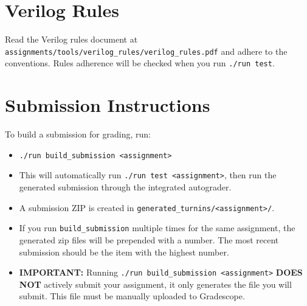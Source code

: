 \documentclass[12pt]{article}
\begin{document}
\section*{Verilog Rules}
Read the Verilog rules document at \texttt{assignments/tools/verilog\_rules/verilog\_rules.pdf} and adhere to the conventions.
Rules adherence will be checked when you run \texttt{./run test}.

\section*{Submission Instructions}

To build a submission for grading, run:
\begin{itemize}
\item \texttt{./run build\_submission <assignment>}
\item This will automatically run \texttt{./run test <assignment>}, then run the generated submission
through the integrated autograder.
\item A submission ZIP is created in \texttt{generated\_turnins/<assignment>/}.
\item If you run \texttt{build\_submission} multiple times for the same assignment, the generated zip files will be prepended with a number. The most recent submission should be the item with the highest number.
\item \textbf{IMPORTANT:} Running \texttt{./run build\_submission <assignment>} \textbf{DOES NOT} actively submit your assignment, it only generates the file you will submit. This file must be manually uploaded to Gradescope.
\end{itemize}
\end{document}
